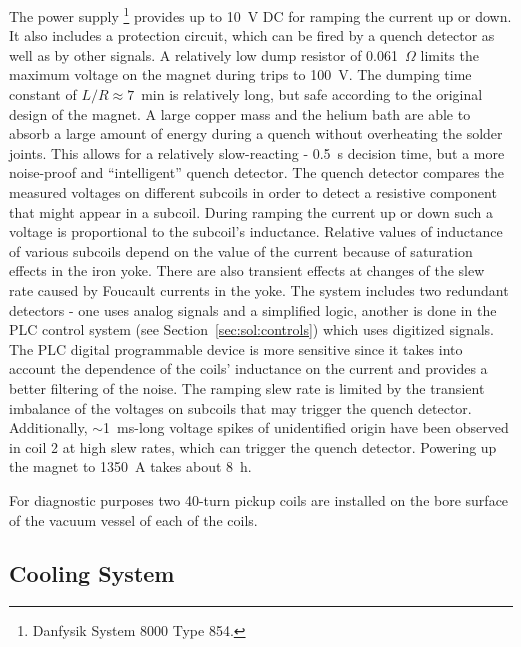 The power supply%
\footnote{Danfysik System 8000 Type 854.}
provides up to 10~V DC for ramping the current up or down. It also
includes a protection circuit, which can be fired by a quench
detector as well as by other signals.  A relatively low dump resistor
of 0.061~$\Omega$ limits the maximum voltage on the magnet during
trips to 100~V. The dumping time constant of $L/R \approx 7$~min is
relatively long, but safe according to the original design of the
magnet. A large copper mass and the helium bath are able to absorb a
large amount of energy during a quench without overheating the solder
joints. This allows for a relatively slow-reacting - 0.5~s decision
time, but a more noise-proof and ``intelligent'' quench detector.  The
quench detector compares the measured voltages on different subcoils
in order to detect a resistive component that might appear in a
subcoil.
During ramping the current up or down such a voltage is proportional
to the subcoil's inductance.  Relative values of inductance of various
subcoils depend on the value of the current because of saturation
effects in the iron yoke. There are also transient effects at changes
of the slew rate caused by Foucault currents in the yoke.
The system includes two redundant detectors - one uses analog signals
and a simplified logic, another is done in the PLC control system (see
Section~\ref{sec:sol:controls}) which uses digitized signals. The PLC
digital programmable device is more sensitive since it takes into
account the dependence of the coils' inductance on the current and
provides a better filtering of the noise.  The ramping slew rate is
limited by the transient imbalance of the voltages on subcoils that
may trigger the quench detector. Additionally, $\sim$1~ms-long voltage
spikes of unidentified origin have been observed in coil 2 at high
slew rates, which can  trigger the quench detector. Powering up the
magnet to 1350~A takes about 8~h.

For diagnostic purposes two 40-turn pickup coils are installed on the bore
surface of the vacuum vessel of each of the coils. 

\subsection[Cooling System]{
   Cooling System
   \label{sec:sol:cryo}
}

